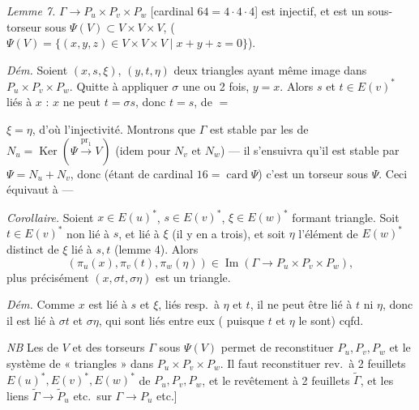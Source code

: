 \documentclass[11pt,a4paper]{article}
\begin{document}
 \emph{Lemme 7.} $\Gamma \to P_u \times P_v \times P_w$
[cardinal $64 = 4 \cdot 4 \cdot 4$] est injectif, et \struck{\ill{}}
 est un sous-torseur sous $\Psi(V) \subset V \times
V \times V$, ($\Psi(V) = \lbrace (x, y, z) \in V \times V \times V \mid x + y + z
= 0 \rbrace$).

\emph{Dém.} Soient $(x, s, \xi)$, $(y, t, \eta)$ deux triangles ayant même
image dans $P_u \times P_v \times P_w$. Quitte à appliquer $\sigma$ une ou 2
fois,  $y = x$. Alors $s$ et $t \in E(v)^{*}$ liés à $x$ : $x$ ne
peut  \ill{} $t = \sigma s$, donc $t = s$, de $=$


$\xi = \eta$, d'où l'injectivité. Montrons que $\Gamma$ est stable par les
 de $N_u = \operatorname{Ker}(\Psi \xrightarrow{\mathrm{pr}_1} V)$
(idem \ill{} pour $N_v$ et $N_w$) --- il s'ensuivra qu'il est stable par $\Psi
= N_u + N_v$, donc (étant de cardinal $16 = \operatorname{card} \Psi$) c'est un
torseur sous $\Psi$. Ceci équivaut à ---

\emph{Corollaire.} Soient $x \in E(u)^{*}$, $s \in E(v)^{*}$, $\xi \in
E(w)^{*}$ formant triangle.  Soit \struck{\ill{}} $t \in E(v)^{*}$
 non lié à $s$, et lié à $\xi$ (il y en a trois), et soit $\eta$
l'élément de $E(w)^{*}$ distinct de $\xi$ lié à $s, t$ (lemme 4). Alors
\[
(\pi_u(x), \pi_v(t), \pi_w(\eta)) \in \operatorname{Im}(\Gamma \to P_u \times
P_v \times P_w),
\]
 
plus précisément $(x, \sigma t, \sigma\eta)$ est un triangle.

\emph{Dém.} Comme $x$ est lié à $s$ et $\xi$, liés resp.\ à $\eta$ et $t$, il ne
peut être lié à $t$ ni $\eta$, donc il est lié à $\sigma t$ et $\sigma\eta$, qui
sont liés entre eux ( puisque $t$ et $\eta$ le sont) cqfd.

\emph{NB} Les  de $V$ et des torseurs $\Gamma$ sous $\Psi(V)$
permet de reconstituer $P_u, P_v, P_w$ et le système de « triangles » dans $P_u
\times P_v \times P_w$. Il faut  reconstituer  rev.\ à 2
feuillets $E(u)^{*}, E(v)^{*}, E(w)^{*}$  de $P_u, P_v, P_w$, et le revêtement à 2 feuillets
$\tilde{\Gamma}$, et les liens $\tilde{\Gamma} \to \tilde{P}_u$ etc.\ sur $\Gamma
\to P_u$ etc.]
\end{document}
